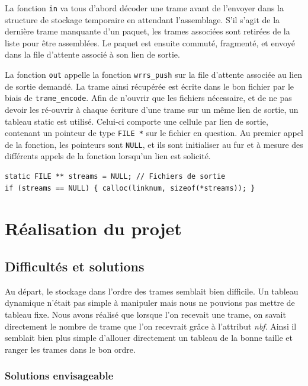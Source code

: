 \documentclass[a4paper,11pt]{article}
\begin{document}
La fonction \texttt{in} va tous d'abord décoder une trame avant de
l'envoyer dans la structure de stockage temporaire en attendant
l'assemblage. S'il s'agit de la dernière trame manquante d'un paquet,
les trames associées sont retirées de la liste pour être assemblées. Le
paquet est ensuite commuté, fragmenté, et envoyé dans la file d'attente
associé à son lien de sortie.

La fonction \texttt{out} appelle la fonction \texttt{wrrs\_push} sur la
file d'attente associée au lien de sortie demandé. La trame ainsi
récupérée est écrite dans le bon fichier par le biais de 
\texttt{trame\_encode}. Afin de n'ouvrir que les fichiers nécessaire, et
de ne pas devoir les ré-ouvrir à chaque écriture d'une trame sur un même
lien de sortie, un tableau static est utilisé. Celui-ci comporte une
cellule par lien de sortie, contenant un pointeur de type \texttt{FILE *}
sur le fichier en question. Au premier appel de la fonction, les pointeurs
sont \texttt{NULL}, et ils sont initialiser au fur et à mesure des
différents appels de la fonction lorsqu'un lien est solicité.
\begin{verbatim}
static FILE ** streams = NULL; // Fichiers de sortie
if (streams == NULL) { calloc(linknum, sizeof(*streams)); }
\end{verbatim}



\section{Réalisation du projet}

\subsection{Difficultés et solutions}

Au départ, le stockage dans l'ordre des trames semblait bien difficile. Un tableau dynamique n'était pas simple à manipuler mais nous ne pouvions pas mettre de tableau fixe. Nous avons réalisé que lorsque l'on recevait une trame, on savait directement le nombre de trame que l'on recevrait grâce à l'attribut \textit{nbf}. Ainsi il semblait bien plus simple d'allouer directement un tableau de la bonne taille et ranger les trames dans le bon ordre.

\subsubsection{Solutions envisageable}
\end{document}
